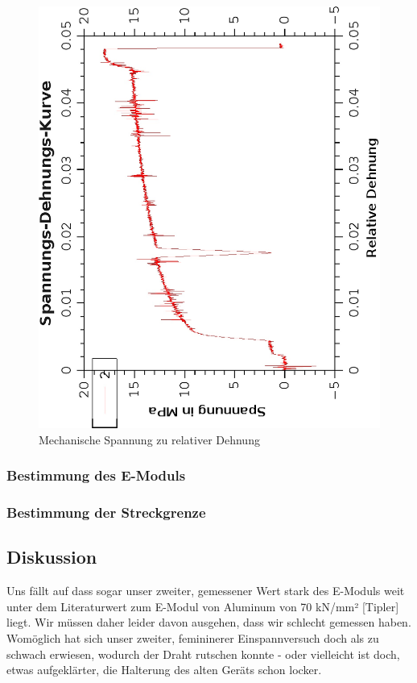 \documentclass{article}
\begin{document}
\begin{center}
\begin{figure}
\caption{Mechanische Spannung zu relativer Dehnung}
\includegraphics[scale=0.7,angle=-90]{spannungsdehnungskurve.eps}
\end{figure}
\end{center}
\subsubsection*{Bestimmung des E-Moduls}
\subsubsection*{Bestimmung der Streckgrenze}
\subsection{Diskussion}
Uns fällt auf dass sogar unser zweiter, gemessener Wert stark des E-Moduls weit unter dem
Literaturwert zum E-Modul von Aluminum von 70 kN/mm² [Tipler] liegt. Wir müssen daher leider davon ausgehen, dass wir schlecht gemessen haben. Womöglich hat sich unser zweiter, femininerer Einspannversuch doch als zu schwach erwiesen, wodurch der Draht rutschen konnte - oder vielleicht ist doch, etwas aufgeklärter, die Halterung des alten Geräts schon locker.
\end{document}
